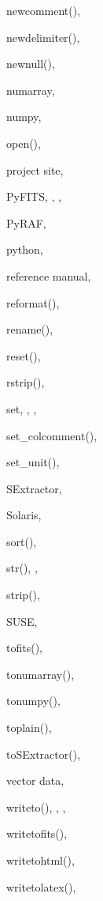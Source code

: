 \begin{theindex}
  \indexspace

  \item newcomment(), 
  \item newdelimiter(), 
  \item newnull(), 
  \item numarray, 
  \item numpy, 

  \indexspace

  \item open(), 

  \indexspace

  \item project site, 
  \item PyFITS, , , 
  \item PyRAF, 
  \item python, 

  \indexspace

  \item reference manual, 
  \item reformat(), 
  \item rename(), 
  \item reset(), 
  \item rstrip(), 

  \indexspace

  \item set, , , 
  \item set\_colcomment(), 
  \item set\_unit(), 
  \item SExtractor, 
  \item Solaris, 
  \item sort(), 
  \item str(), , 
  \item strip(), 
  \item SUSE, 

  \indexspace

  \item tofits(), 
  \item tonumarray(), 
  \item tonumpy(), 
  \item toplain(), 
  \item toSExtractor(), 

  \indexspace

  \item vector data, 

  \indexspace

  \item writeto(), , , 
  \item writetofits(), 
  \item writetohtml(), 
  \item writetolatex(), 

\end{theindex}
